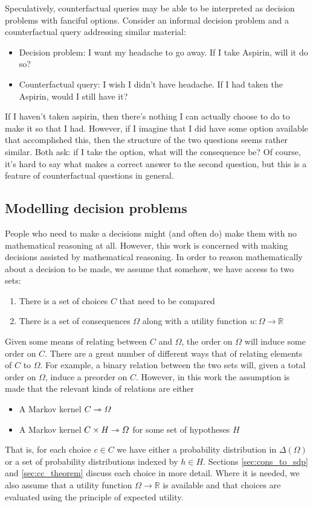 Speculatively, counterfactual queries may be able to be interpreted as decision problems with fanciful options. Consider an informal decision problem and a counterfactual query addressing similar material:
\begin{itemize}
    \item Decision problem: I want my headache to go away. If I take Aspirin, will it do so?
    \item Counterfactual query: I wish I didn't have headache. If I had taken the Aspirin, would I still have it?
\end{itemize}
If I haven't taken aspirin, then there's nothing I can actually choose to do to make it so that I had. However, if I imagine that I did have some option available that accomplished this, then the structure of the two questions seems rather similar. Both ask: if I take the option, what will the consequence be? Of course, it's hard to say what makes a correct answer to the second question, but this is a feature of counterfactual questions in general.

\subsection{Modelling decision problems}\label{sec:modelling_decision_problems}

People who need to make a decisions might (and often do) make them with no mathematical reasoning at all. However, this work is concerned with making decisions assisted by mathematical reasoning. In order to reason mathematically about a decision to be made, we assume that somehow, we have access to two sets:
\begin{enumerate}
    \item There is a set of choices $C$ that need to be compared
    \item There is a set of consequences $\Omega$ along with a utility function $u:\Omega\to \mathbb{R}$
\end{enumerate}

Given some means of relating between $C$ and $\Omega$, the order on $\Omega$ will induce some order on $C$. There are a great number of different ways that of relating elements of $C$ to $\Omega$. For example, a binary relation between the two sets will, given a total order on $\Omega$, induce a preorder on $C$. However, in this work the assumption is made that the relevant kinds of relations are either
\begin{itemize}
    \item A Markov kernel $C\rightarrowtriangle \Omega$
    \item A Markov kernel $C\times H\rightarrowtriangle \Omega$ for some set of hypotheses $H$
\end{itemize}
That is, for each choice $c\in C$ we have either a probability distribution in $\Delta(\Omega)$ or a set of probability distributions indexed by $h\in H$. Sections \ref{sec:cons_to_sdp} and \ref{sec:cc_theorem} discuss each choice in more detail. Where it is needed, we also assume that a utility function $\Omega\to \mathbb{R}$ is available and that choices are evaluated using the principle of expected utility.

